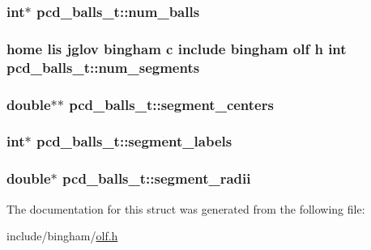 \label{structpcd__balls__t_a3d80371d7775a4954c290f071445ed97}
\hypertarget{structpcd__balls__t_a88da05a4699de3b68c6fffd113c5a54b}{
\subsubsection[{num\_\-balls}]{\setlength{\rightskip}{0pt plus 5cm}int$\ast$ {\bf pcd\_\-balls\_\-t::num\_\-balls}}}
\label{structpcd__balls__t_a88da05a4699de3b68c6fffd113c5a54b}
\hypertarget{structpcd__balls__t_a4f67b1155f40c7e9d19ca0ccd0e44d41}{
\subsubsection[{num\_\-segments}]{\setlength{\rightskip}{0pt plus 5cm}home lis jglov bingham c include bingham olf h int {\bf pcd\_\-balls\_\-t::num\_\-segments}}}
\label{structpcd__balls__t_a4f67b1155f40c7e9d19ca0ccd0e44d41}
\hypertarget{structpcd__balls__t_acca3659164fdf56361516b17d793b856}{
\subsubsection[{segment\_\-centers}]{\setlength{\rightskip}{0pt plus 5cm}double$\ast$$\ast$ {\bf pcd\_\-balls\_\-t::segment\_\-centers}}}
\label{structpcd__balls__t_acca3659164fdf56361516b17d793b856}
\hypertarget{structpcd__balls__t_aeed65531f4d0aa9967c5de9e2636ea34}{
\subsubsection[{segment\_\-labels}]{\setlength{\rightskip}{0pt plus 5cm}int$\ast$ {\bf pcd\_\-balls\_\-t::segment\_\-labels}}}
\label{structpcd__balls__t_aeed65531f4d0aa9967c5de9e2636ea34}
\hypertarget{structpcd__balls__t_a8805787d802a4dd0d0895ef525c20d16}{
\subsubsection[{segment\_\-radii}]{\setlength{\rightskip}{0pt plus 5cm}double$\ast$ {\bf pcd\_\-balls\_\-t::segment\_\-radii}}}
\label{structpcd__balls__t_a8805787d802a4dd0d0895ef525c20d16}


The documentation for this struct was generated from the following file:\begin{DoxyCompactItemize}
\item 
include/bingham/\hyperlink{olf_8h}{olf.h}\end{DoxyCompactItemize}
